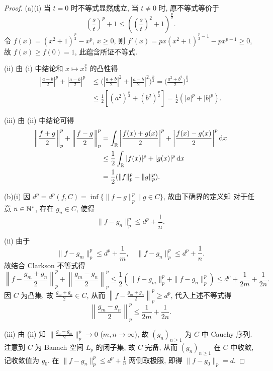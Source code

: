\begin{proof}
     (a)(i) 当 $t=0$ 时不等式显然成立, 当 $t\neq 0$ 时, 原不等式等价于
     \[\left(\frac{s}{t}\right)^p+1\leq\left(\left(\frac{s}{t}\right)^2+1\right)^{\frac{p}{2}}.\]
     令 $f(x)=(x^2+1)^{\frac{p}{2}}-x^p$, $x\geq 0$, 则
     $f'(x)=px(x^2+1)^{\frac{p}{2}-1}-px^{p-1}\geq 0$,
     故 $f(x)\geq f(0)=1$, 此蕴含所证不等式.

     (ii) 由 (i) 中结论和 $x\mapsto x^{\frac{p}{2}}$ 的凸性得
     \begin{align*}
         \left|\frac{a+b}{2}\right|^p+\left|\frac{a-b}{2}\right|^p
         & \leq\biggl(\left|\frac{a+b}{2}\right|^2+\left|\frac{a-b}{2}\right|^2\biggr)^{\frac{p}{2}}  =\biggl(\frac{a^2+b^2}{2}\biggr)^{\frac{p}{2}} \\
         & \leq\frac{1}{2}\left[(a^2)^{\frac{p}{2}}+(b^2)^{\frac{p}{2}}\right] =\frac{1}{2}(|a|^p+|b|^p).
     \end{align*}

     (iii) 由 (ii) 中结论可得
     \begin{align*}
        \left\|\frac{f+g}{2}\right\|_{p}^{p}+\left\|\frac{f-g}{2}\right\|_{p}^{p}
        & =\int_{\mathbb{R}}\left|\frac{f(x)+g(x)}{2}\right|^p+\left|\frac{f(x)-g(x)}{2}\right|^p\mathop{}\!\mathrm{d} x \\
        & \leq\frac{1}{2}\int_{\mathbb{R}} |f(x)|^p+|g(x)|^p \mathop{}\!\mathrm{d} x \\
        & =\frac{1}{2}(\|f\|_p^p+\|g\|_p^p).
     \end{align*} 

     (b)(i) 因 $d^p=d^p(f,C)=\inf\{\|f-g\|_p^p\mid g\in C\}$, 故由下确界的定义知
     对于任意 $n\in\mathbb{N}^*$, 存在 $g_n\in C$, 使得
     \[\|f-g_n\|_p^p\leq d^p+\frac{1}{n}.\]

     (ii) 由于
     \[\|f-g_m\|_p^p\leq d^p+\frac{1}{m},\quad \|f-g_n\|_p^p\leq d^p+\frac{1}{n}.\]
     故结合 Clarkson 不等式得
     \[\left\| f-\frac{g_m+g_n}{2}\right\|_p^p+\left\|\frac{g_m-g_n}{2}\right\|_p^p\leq\frac{1}{2}\left(\|f-g_m\|_p^p+\|f-g_n\|_p^p\right)\leq d^p+\frac{1}{2m}+\frac{1}{2n}.\]
     因 $C$ 为凸集, 故 $\frac{g_m+g_n}{2}\in C$, 从而 $\left\|f-\frac{g_m+g_n}{2}\right\|_p^p\geq d^p$,
     代入上述不等式得
     \[\left\|\frac{g_m-g_n}{2}\right\|_p^p\leq\frac{1}{2m}+\frac{1}{2n}.\]

     (iii) 由 (ii) 知 $\|\frac{g_n-g_m}{2}\|_p^p\to 0$ ($m,n\to\infty$),
     故 $(g_n)_{n\geq 1}$ 为 $C$ 中 Cauchy 序列. 注意到 $C$ 为 Banach 空间 $L_p$
     的闭子集, 故 $C$ 完备, 从而 $(g_n)_{n\geq 1}$ 在 $C$ 中收敛, 记收敛值为 $g_0$.
     在 $\|f-g_n\|_p^p\leq d^p+\frac{1}{n}$ 两侧取极限, 即得 $\|f-g_0\|_p=d$.


\end{proof}
